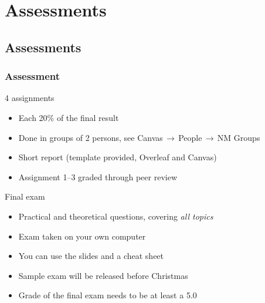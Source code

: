 \section{Assessments}
\subsection{Assessments}
{\nologo
\begin{frame}
 \frametitle{Assessment}
 \begin{block}{4 assignments}
  \begin{itemize}
    \item Each 20\% of the final result
    \item Done in groups of 2 persons, see Canvas$\,\to\,$People$\,\to\,$NM Groups
    \item Short report (template provided, Overleaf and Canvas)
    \item Assignment 1--3 graded through peer review
    \end{itemize}   
 \end{block}
 \pause
 \begin{block}{Final exam}
  \begin{itemize}
    \item Practical and theoretical questions, covering \emph{all topics}
    \item Exam taken on your own computer
    \item You can use the slides and a cheat sheet
    \item Sample exam will be released before Christmas
    \item Grade of the final exam needs to be at least a 5.0
  \end{itemize}   
 \end{block}
\end{frame}
}

